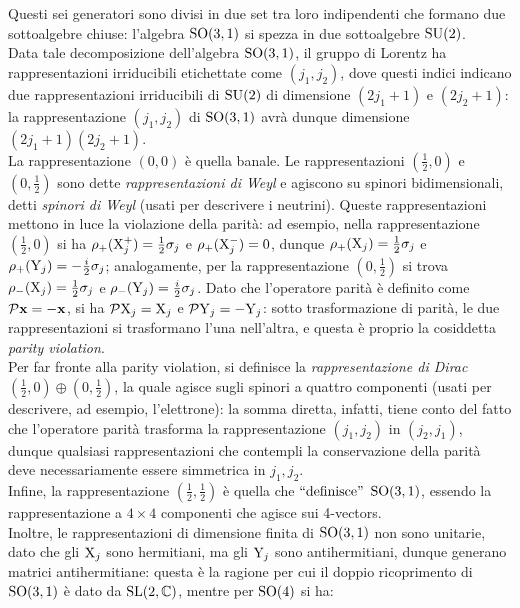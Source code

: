 Questi sei generatori sono divisi in due set tra loro indipendenti che formano due sottoalgebre chiuse: l'algebra $ \mathrm{SO}(3,1) $ si spezza in due sottoalgebre $ \mathrm{SU}(2) $.\\
Data tale decomposizione dell'algebra $ \mathrm{SO}(3,1) $, il gruppo di Lorentz ha rappresentazioni irriducibili etichettate come $ \left( j_1,j_2 \right) $, dove questi indici indicano due rappresentazioni irriducibili di $ \mathrm{SU}(2) $ di dimensione $ (2j_1 + 1) $ e $ (2j_2 + 1) $: la rappresentazione $ (j_1,j_2) $ di $ \mathrm{SO}(3,1) $ avrà dunque dimensione $ (2j_1 + 1)(2j_2 + 1) $.\\
La rappresentazione $ (0,0) $ è quella banale. Le rappresentazioni $ (\frac{1}{2},0) $ e $ (0,\frac{1}{2}) $ sono dette \textit{rappresentazioni di Weyl} e agiscono su spinori bidimensionali, detti \textit{spinori di Weyl} (usati per descrivere i neutrini). Queste rappresentazioni mettono in luce la violazione della parità: ad esempio, nella rappresentazione $ (\frac{1}{2},0) $ si ha $ \rho_+(\mathrm{X}^+_j) = \frac{1}{2} \sigma_j $ e $ \rho_+(\mathrm{X}^-_j) = 0 $, dunque $ \rho_+(\mathrm{X}_j) = \frac{1}{2} \sigma_j $ e $ \rho_+(\mathrm{Y}_j) = - \frac{i}{2} \sigma_j $; analogamente, per la rappresentazione $ (0,\frac{1}{2}) $ si trova $ \rho_-(\mathrm{X}_j) = \frac{1}{2} \sigma_j $ e $ \rho_-(\mathrm{Y}_j) = \frac{i}{2} \sigma_j $. Dato che l'operatore parità è definito come $ \mathcal{P}\mathbf{x} = - \mathbf{x} $, si ha $ \mathcal{P}\mathrm{X}_j = \mathrm{X}_j $ e $ \mathcal{P}\mathrm{Y}_j = -\mathrm{Y}_j $: sotto trasformazione di parità, le due rappresentazioni si trasformano l'una nell'altra, e questa è proprio la cosiddetta \textit{parity violation}.\\
Per far fronte alla parity violation, si definisce la \textit{rappresentazione di Dirac} $ (\frac{1}{2},0) \oplus (0,\frac{1}{2}) $, la quale agisce sugli spinori a quattro componenti (usati per descrivere, ad esempio, l'elettrone): la somma diretta, infatti, tiene conto del fatto che l'operatore parità trasforma la rappresentazione $ (j_1,j_2) $ in $ (j_2,j_1) $, dunque qualsiasi rappresentazioni che contempli la conservazione della parità deve necessariamente essere simmetrica in $ j_1,j_2 $.\\
Infine, la rappresentazione $ (\frac{1}{2},\frac{1}{2}) $ è quella che $ ``\text{definisce}" $ $ \mathrm{SO}(3,1) $, essendo la rappresentazione a $ 4 \times 4 $ componenti che agisce sui 4-vectors.\\
Inoltre, le rappresentazioni di dimensione finita di $ \mathrm{SO}(3,1) $ non sono unitarie, dato che gli $ \mathrm{X}_j $ sono hermitiani, ma gli $ \mathrm{Y}_j $ sono antihermitiani, dunque generano matrici antihermitiane: questa è la ragione per cui il doppio ricoprimento di $ \mathrm{SO}(3,1) $ è dato da $ \mathrm{SL}(2,\mathbb{C}) $, mentre per $ \mathrm{SO}(4) $ si ha:
